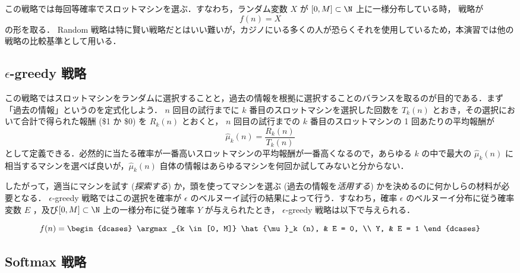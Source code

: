 \documentclass{jsarticle}
\def\hmukn{\hat{\mu}_k (n)}
\begin{document}
この戦略では毎回等確率でスロットマシンを選ぶ．すなわち，ランダム変数 $X$ が $[0, M] \subset \N$ 上に一様分布している時， 戦略が
\begin{equation}
  f(n) = X
\end{equation}
の形を取る． Random 戦略は特に賢い戦略だとはいい難いが，カジノにいる多くの人が恐らくそれを使用しているため，本演習では他の戦略の比較基準として用いる．

\subsection{$\epsilon$-greedy 戦略}

この戦略ではスロットマシンをランダムに選択することと，過去の情報を根拠に選択することのバランスを取るのが目的である．まず「過去の情報」というのを定式化しよう． $n$ 回目の試行までに $k$ 番目のスロットマシンを選択した回数を $T_k(n)$ とおき，その選択において合計で得られた報酬 (\$1 か \$0) を $R_k(n)$ とおくと， $n$ 回目の試行までの $k$ 番目のスロットマシンの 1 回あたりの平均報酬が
\begin{equation}
  \hmukn = \frac{R_k(n)}{T_k(n)}
\end{equation}
として定義できる．必然的に当たる確率が一番高いスロットマシンの平均報酬が一番高くなるので，あらゆる $k$ の中で最大の $\hmukn$ に相当するマシンを選べば良いが，$\hmukn$ 自体の情報はあらゆるマシンを何回か試してみないと分からない．

したがって，適当にマシンを試す ({\em 探索する\/}) か，頭を使ってマシンを選ぶ (過去の情報を{\em 活用する\/}) かを決めるのに何かしらの材料が必要となる． $\epsilon$-greedy 戦略ではこの選択を確率が $\epsilon$ のベルヌーイ試行の結果によって行う．すなわち，確率 $\epsilon$ のベルヌーイ分布に従う確率変数 $E$ ，及び$[0, M] \subset \N$ 上の一様分布に従う確率 $Y$ が与えられたとき， $\epsilon$-greedy 戦略は以下で与えられる．

\begin{equation}
  f(n) = \begin{dcases}
    \argmax_{k \in [0, M]} \hmukn, & E = 0, \\
    Y, & E = 1
  \end{dcases}
\end{equation}

\subsection{Softmax 戦略}
\end{document}

